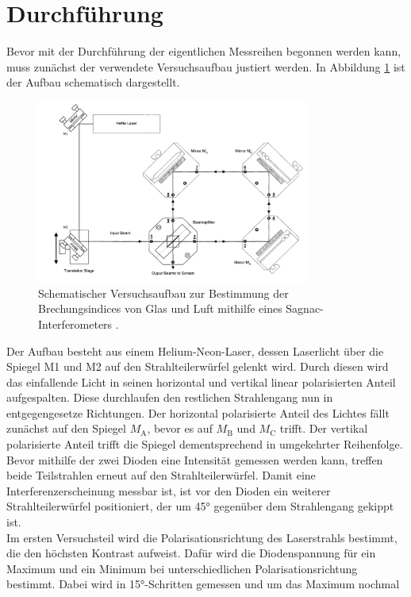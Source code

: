 \section{Durchführung}
Bevor mit der Durchführung der eigentlichen Messreihen begonnen werden kann, muss zunächst 
der verwendete Versuchsaufbau justiert werden. In Abbildung \ref{fig:aufbau} ist der Aufbau
schematisch dargestellt.
\begin{figure}[H]
    \centering
    \includegraphics[width=0.8\textwidth]{bilder/Aufbau.png}
    \caption{Schematischer Versuchsaufbau zur Bestimmung der Brechungsindices von Glas und Luft
    mithilfe eines Sagnac-Interferometers \cite{anleitung}.}
    \label{fig:aufbau}
\end{figure} \noindent
Der Aufbau besteht aus einem Helium-Neon-Laser, dessen Laserlicht über die Spiegel M1 und M2 
auf den Strahlteilerwürfel gelenkt wird. Durch diesen wird das einfallende Licht in seinen
horizontal und vertikal linear polarisierten Anteil aufgespalten. Diese durchlaufen den restlichen 
Strahlengang nun in entgegengesetze Richtungen. Der horizontal polarisierte Anteil des Lichtes 
fällt zunächst auf den Spiegel $M_\text{A}$, bevor es auf $M_\text{B}$ und $M_\text{C}$ trifft. 
Der vertikal polarisierte Anteil trifft die Spiegel dementsprechend in umgekehrter Reihenfolge. 
Bevor mithilfe der zwei Dioden eine Intensität gemessen werden kann, treffen beide Teilstrahlen 
erneut auf den Strahlteilerwürfel. Damit eine Interferenzerscheinung messbar ist, ist vor den Dioden
ein weiterer Strahlteilerwürfel positioniert, der um 45° gegenüber dem Strahlengang gekippt ist. \\
Im ersten Versuchsteil wird die Polarisationsrichtung des Laserstrahls bestimmt, die den höchsten
Kontrast aufweist. Dafür wird die Diodenspannung für ein Maximum und ein Minimum bei unterschiedlichen
Polarisationsrichtung bestimmt. Dabei wird in 15°-Schritten gemessen und um das Maximum nochmal
